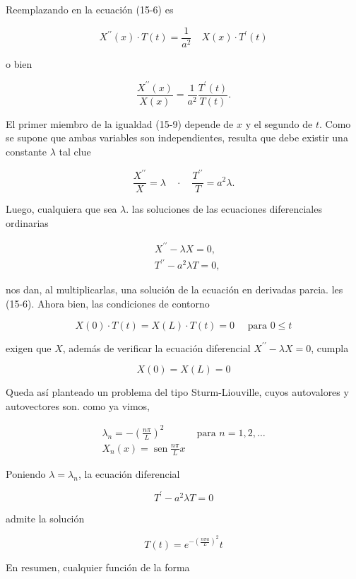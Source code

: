 \documentclass[10pt]{article}
\theoremstyle{plain}
\theoremstyle{definition}
\theoremstyle{remark}
\begin{document}
Reemplazando en la ecuación (15-6) es

$$
X^{\prime \prime}(x) \cdot T(t)=\frac{1}{a^{2}} \quad X(x) \cdot T^{\prime}(t)
$$

o bien


\begin{equation*}
\frac{X^{\prime \prime}(x)}{X(x)}=\frac{1}{a^{2}} \frac{T^{\prime}(t)}{T(t)} . \tag{15.9}
\end{equation*}


El primer miembro de la igualdad (15-9) depende de $x$ y el segundo de $t$. Como se supone que ambas variables son independientes, resulta que debe existir una constante $\lambda$ tal clue

$$
\frac{X^{\prime \prime}}{X}=\lambda \quad \cdot \quad \frac{T^{\prime \prime}}{T}=a^{2} \lambda .
$$

Luego, cualquiera que sea $\lambda$. las soluciones de las ecuaciones diferenciales ordinarias

$$
\begin{aligned}
& X^{\prime \prime}-\lambda X=0, \\
& T^{\prime \prime}-a^{2} \lambda T=0,
\end{aligned}
$$

nos dan, al multiplicarlas, una solución de la ecuación en derivadas parcia. les (15-6). Ahora bien, las condiciones de contorno

$$
X(0) \cdot T(t)=X(L) \cdot T(t)=0 \quad \text { para } 0 \leqslant t
$$

exigen que $X$, además de verificar la ecuación diferencial $X^{\prime \prime}-\lambda X=0$, cumpla

$$
X(0)=X(L)=0
$$

Queda así planteado un problema del tipo Sturm-Liouville, cuyos autovalores y autovectores son. como ya vimos,

$$
\begin{array}{ll}
\lambda_{n}=-\left(\frac{n \pi}{L}\right)^{2} & \text { para } n=1,2, \ldots \\
X_{n}(x)=\operatorname{sen} \frac{n \pi}{L} x &
\end{array}
$$

Poniendo $\lambda=\lambda_{n}$, la ecuación diferencial

$$
T^{\prime}-a^{2} \lambda T=0
$$

admite la solución

$$
T(t)=e^{-\left(\frac{n \pi a}{L}\right)^{2}} t
$$

En resumen, cualquier función de la forma
\end{document}
